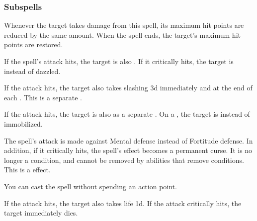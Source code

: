 \subsubsection{Subspells}



Whenever the target takes damage from this spell, its maximum hit points are reduced by the same amount.
When the spell ends, the target's maximum hit points are restored.







If the spell's attack hits, the target is also \dazzled. If it critically hits, the target is \blinded instead of dazzled.







If the attack hits, the target also takes slashing  \minus3d immediately and at the end of each .
This is a separate .







If the attack hits, the target is also  as a separate .
On a , the target is  instead of immobilized.







The spell's attack is made against Mental defense instead of Fortitude defense.
In addition, if it critically hits, the spell's effect becomes a permanent curse.
It is no longer a condition, and cannot be removed by abilities that remove conditions.
This is a  effect.






You can cast the spell without spending an action point.






If the attack hits, the target also takes life  \plus1d.
If the attack critically hits, the target immediately dies.



